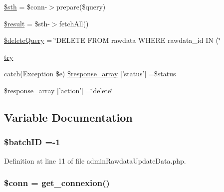 \begin{DoxyCompactItemize}
\hyperlink{admin_rawdata_update_data_8php_afa9126f9664959c02795be300a135f93}{\$sth} = \$conn-\/$>$prepare(\$query)
\item 
\hyperlink{admin_rawdata_update_data_8php_a112ef069ddc0454086e3d1e6d8d55d07}{\$result} = \$sth-\/$>$fetch\-All()
\item 
\hyperlink{admin_rawdata_update_data_8php_ad08dc0a05af9c3e0730669485af92e41}{\$delete\-Query} = \char`\"{}D\-E\-L\-E\-T\-E F\-R\-O\-M rawdata W\-H\-E\-R\-E rawdata\-\_\-id I\-N (\char`\"{}
\item 
\hyperlink{admin_rawdata_update_data_8php_abe4cc9788f52e49485473dc699537388}{try}
\item 
catch(Exception \$e) \hyperlink{admin_rawdata_update_data_8php_a8452fb8131316637a04e25f5fde066d9}{\$response\-\_\-array} \mbox{[}'status'\mbox{]} =\$status
\item 
\hyperlink{admin_rawdata_update_data_8php_ae768978a0cdc416c0d63d798c85c8784}{\$response\-\_\-array} \mbox{[}'action'\mbox{]} =\char`\"{}delete\char`\"{}
\end{DoxyCompactItemize}


\subsection{Variable Documentation}
\hypertarget{admin_rawdata_update_data_8php_aaa6d122ea9cb55b210aadd86e5654a74}{
\subsubsection[{\$batch\-I\-D}]{\setlength{\rightskip}{0pt plus 5cm}\${\bf batch\-I\-D} =-\/1}}\label{admin_rawdata_update_data_8php_aaa6d122ea9cb55b210aadd86e5654a74}


Definition at line 11 of file admin\-Rawdata\-Update\-Data.\-php.

\hypertarget{admin_rawdata_update_data_8php_aa8a5a87b9c1a6a0819b88447cbe41877}{
\subsubsection[{\$conn}]{\setlength{\rightskip}{0pt plus 5cm}\$conn = {\bf get\-\_\-connexion}()}}\label{admin_rawdata_update_data_8php_aa8a5a87b9c1a6a0819b88447cbe41877}


